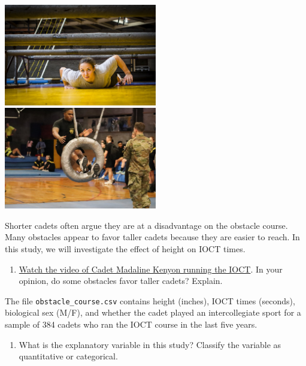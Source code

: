 \documentclass[
]{book}
\providecommand{\tightlist}{%
  \setlength{\itemsep}{0pt}\setlength{\parskip}{0pt}}
\begin{document}
\includegraphics[width=0.5\textwidth,height=\textheight]{./images/crawlObstacle.jpg} \includegraphics[width=0.5\textwidth,height=\textheight]{./images/tireObstacle.jpg}

Shorter cadets often argue they are at a disadvantage on the obstacle course. Many obstacles appear to favor taller cadets because they are easier to reach. In this study, we will investigate the effect of height on IOCT times.

\begin{enumerate}
\def\labelenumi{\arabic{enumi}.}
\tightlist
\item
  \href{https://www.youtube.com/watch?v=94tPO0fGtJo\&t=77s}{Watch the video of Cadet Madaline Kenyon running the IOCT}. In your opinion, do some obstacles favor taller cadets? Explain.
\end{enumerate}

\vspace{1in}

The file \texttt{obstacle\_course.csv} contains height (inches), IOCT times (seconds), biological sex (M/F), and whether the cadet played an intercollegiate sport for a sample of 384 cadets who ran the IOCT course in the last five years.

\begin{enumerate}
\def\labelenumi{\arabic{enumi}.}
\setcounter{enumi}{1}
\tightlist
\item
  What is the explanatory variable in this study? Classify the variable as quantitative or categorical.
\end{enumerate}

\vspace{0.25in}
\end{document}
